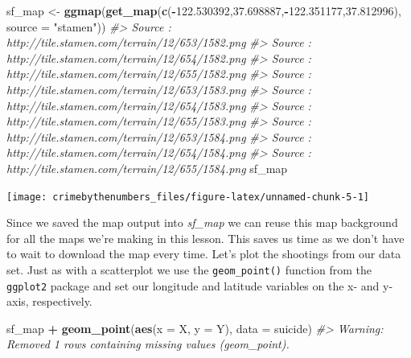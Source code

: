 \documentclass[
  12pt,
]{book}
\newenvironment{Shaded}{\begin{snugshade}}{\end{snugshade}}
\newcommand{\CommentTok}[1]{\textcolor[rgb]{0.37,0.37,0.37}{\textit{#1}}}
\newcommand{\DataTypeTok}[1]{\textcolor[rgb]{0.27,0.27,0.27}{#1}}
\newcommand{\FloatTok}[1]{\textcolor[rgb]{0.06,0.06,0.06}{#1}}
\newcommand{\KeywordTok}[1]{\textcolor[rgb]{0.27,0.27,0.27}{\textbf{#1}}}
\newcommand{\NormalTok}[1]{#1}
\newcommand{\OperatorTok}[1]{\textcolor[rgb]{0.43,0.43,0.43}{\textbf{#1}}}
\newcommand{\StringTok}[1]{\textcolor[rgb]{0.5,0.5,0.5}{#1}}
\begin{document}
\begin{Shaded}
\begin{Highlighting}[]
\NormalTok{sf\_map \textless{}{-}}\StringTok{ }\KeywordTok{ggmap}\NormalTok{(}\KeywordTok{get\_map}\NormalTok{(}\KeywordTok{c}\NormalTok{(}\OperatorTok{{-}}\FloatTok{122.530392}\NormalTok{,}\FloatTok{37.698887}\NormalTok{,}\OperatorTok{{-}}\FloatTok{122.351177}\NormalTok{,}\FloatTok{37.812996}\NormalTok{), }
                            \DataTypeTok{source =} \StringTok{"stamen"}\NormalTok{))}
\CommentTok{\#\textgreater{} Source : http://tile.stamen.com/terrain/12/653/1582.png}
\CommentTok{\#\textgreater{} Source : http://tile.stamen.com/terrain/12/654/1582.png}
\CommentTok{\#\textgreater{} Source : http://tile.stamen.com/terrain/12/655/1582.png}
\CommentTok{\#\textgreater{} Source : http://tile.stamen.com/terrain/12/653/1583.png}
\CommentTok{\#\textgreater{} Source : http://tile.stamen.com/terrain/12/654/1583.png}
\CommentTok{\#\textgreater{} Source : http://tile.stamen.com/terrain/12/655/1583.png}
\CommentTok{\#\textgreater{} Source : http://tile.stamen.com/terrain/12/653/1584.png}
\CommentTok{\#\textgreater{} Source : http://tile.stamen.com/terrain/12/654/1584.png}
\CommentTok{\#\textgreater{} Source : http://tile.stamen.com/terrain/12/655/1584.png}
\NormalTok{sf\_map}
\end{Highlighting}
\end{Shaded}

\begin{center}\texttt{[image: crimebythenumbers\_files/figure-latex/unnamed-chunk-5-1]} \end{center}

Since we saved the map output into \emph{sf\_map} we can reuse this map background for all the maps we're making in this lesson. This saves us time as we don't have to wait to download the map every time. Let's plot the shootings from our data set. Just as with a scatterplot we use the \texttt{geom\_point()} function from the \texttt{ggplot2} package and set our longitude and latitude variables on the x- and y-axis, respectively.

\begin{Shaded}
\begin{Highlighting}[]
\NormalTok{sf\_map }\OperatorTok{+}
\StringTok{  }\KeywordTok{geom\_point}\NormalTok{(}\KeywordTok{aes}\NormalTok{(}\DataTypeTok{x =}\NormalTok{ X, }\DataTypeTok{y =}\NormalTok{ Y),}
             \DataTypeTok{data  =}\NormalTok{ suicide)}
\CommentTok{\#\textgreater{} Warning: Removed 1 rows containing missing values (geom\_point).}
\end{Highlighting}
\end{Shaded}
\end{document}
